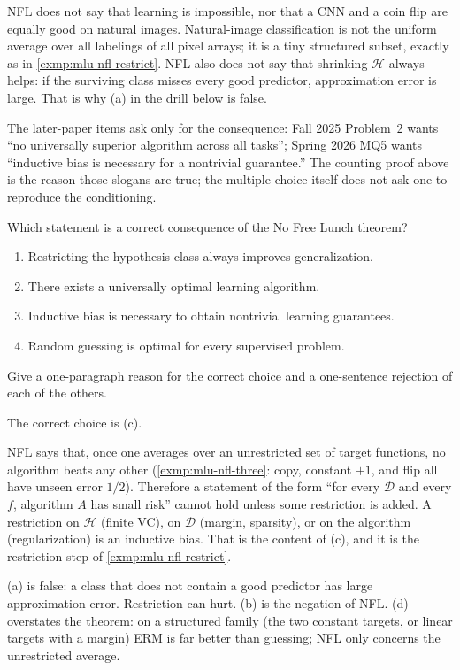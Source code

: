 \begin{remark}
\label{rem:mlu-nfl}
NFL does not say that learning is impossible, nor that a CNN and a coin flip are equally good on natural images. Natural-image classification is not the uniform average over all labelings of all pixel arrays; it is a tiny structured subset, exactly as in \cref{exmp:mlu-nfl-restrict}. NFL also does not say that shrinking $\mathcal{H}$ always helps: if the surviving class misses every good predictor, approximation error is large. That is why (a) in the drill below is false.

The later-paper items ask only for the consequence: Fall 2025 Problem~2 wants ``no universally superior algorithm across all tasks''; Spring 2026 MQ5 wants ``inductive bias is necessary for a nontrivial guarantee.'' The counting proof above is the reason those slogans are true; the multiple-choice itself does not ask one to reproduce the conditioning.
\end{remark}

\begin{exercise}
\label{ex:mlu-nfl-mcq}
Which statement is a correct consequence of the No Free Lunch theorem?
\begin{enumerate}[label=(\alph*)]
    \item Restricting the hypothesis class always improves generalization.
    \item There exists a universally optimal learning algorithm.
    \item Inductive bias is necessary to obtain nontrivial learning guarantees.
    \item Random guessing is optimal for every supervised problem.
\end{enumerate}
Give a one-paragraph reason for the correct choice and a one-sentence rejection of each of the others.
\end{exercise}

\begin{solution}
The correct choice is (c).

NFL says that, once one averages over an unrestricted set of target functions, no algorithm beats any other (\cref{exmp:mlu-nfl-three}: copy, constant $+1$, and flip all have unseen error $1/2$). Therefore a statement of the form ``for every $\mathcal{D}$ and every $f$, algorithm $A$ has small risk'' cannot hold unless some restriction is added. A restriction on $\mathcal{H}$ (finite VC), on $\mathcal{D}$ (margin, sparsity), or on the algorithm (regularization) is an inductive bias. That is the content of (c), and it is the restriction step of \cref{exmp:mlu-nfl-restrict}.

(a) is false: a class that does not contain a good predictor has large approximation error. Restriction can hurt. (b) is the negation of NFL. (d) overstates the theorem: on a structured family (the two constant targets, or linear targets with a margin) ERM is far better than guessing; NFL only concerns the unrestricted average.
\end{solution}


